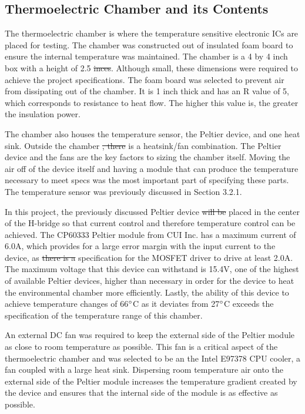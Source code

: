 \documentclass[11pt,letter]{article}
\providecommand{\DIFadd}[1]{{\protect\color{blue}\uwave{#1}}} %
\providecommand{\DIFdel}[1]{{\protect\color{red}\sout{#1}}}                      %
\providecommand{\DIFaddbegin}{} %
\providecommand{\DIFaddend}{} %
\providecommand{\DIFdelbegin}{} %
\providecommand{\DIFdelend}{} %
\newcommand{\DIFscaledelfig}{0.5}
\newlength{\DIFdelgraphicswidth} %
\newlength{\DIFdelgraphicsheight} %
\newcommand{\DIFaddincludegraphics}[2][]{{\color{blue}\fbox{\DIFOincludegraphics[#1]{#2}}}} %
\newcommand{\DIFdelincludegraphics}[2][]{%
\sbox{\DIFdelgraphicsbox}{\DIFOincludegraphics[#1]{#2}}%
\settoboxwidth{\DIFdelgraphicswidth}{\DIFdelgraphicsbox} %
\settoboxtotalheight{\DIFdelgraphicsheight}{\DIFdelgraphicsbox} %
\scalebox{\DIFscaledelfig}{%
\parbox[b]{\DIFdelgraphicswidth}{\usebox{\DIFdelgraphicsbox}\\[-\baselineskip] \rule{\DIFdelgraphicswidth}{0em}}\llap{\resizebox{\DIFdelgraphicswidth}{\DIFdelgraphicsheight}{%
\setlength{\unitlength}{\DIFdelgraphicswidth}%
\begin{picture}(1,1)%
\thicklines\linethickness{2pt} %
{\color[rgb]{1,0,0}\put(0,0){\framebox(1,1){}}}%
{\color[rgb]{1,0,0}\put(0,0){\line( 1,1){1}}}%
{\color[rgb]{1,0,0}\put(0,1){\line(1,-1){1}}}%
\end{picture}%
}\hspace*{3pt}}} %
} %
\DeclareRobustCommand{\DIFaddbegin}{\DIFOaddbegin \let\includegraphics\DIFaddincludegraphics} %
\DeclareRobustCommand{\DIFaddend}{\DIFOaddend \let\includegraphics\DIFOincludegraphics} %
\DeclareRobustCommand{\DIFdelbegin}{\DIFOdelbegin \let\includegraphics\DIFdelincludegraphics} %
\DeclareRobustCommand{\DIFdelend}{\DIFOaddend \let\includegraphics\DIFOincludegraphics} %
\begin{document}
\subsection{Thermoelectric Chamber and its Contents}

The thermoelectric chamber is where the temperature sensitive electronic ICs are placed for testing. The chamber was constructed out of insulated foam board to ensure the internal temperature was maintained. The chamber is a 4 by 4 inch box with a height of 2.5 \DIFdelbegin \DIFdel{inces}\DIFdelend \DIFaddbegin \DIFadd{inches}\DIFaddend . Although small, these dimensions were required to achieve the project specifications. The foam board was selected to prevent air from dissipating out of the chamber. It is 1 inch thick and has an R value of 5, which corresponds to resistance to heat flow. The higher this value is, the greater the insulation power.

The chamber also houses the temperature sensor, the Peltier device, and one heat sink. Outside the chamber \DIFdelbegin \DIFdel{, there }\DIFdelend is a heatsink/fan combination. The Peltier device and the fans are the key factors to sizing the chamber itself. Moving the air off of the device itself and having a module that can produce the temperature necessary to meet specs was the most important part of specifying these parts. The temperature sensor was previously discussed in Section 3.2.1.

In this project, the previously discussed Peltier device \DIFdelbegin \DIFdel{will be }\DIFdelend \DIFaddbegin \DIFadd{is }\DIFaddend placed in the center of the H-bridge so that current control and therefore temperature control can be achieved. The CP60333 Peltier module from CUI Inc. has a maximum current of 6.0A, which provides for a large error margin with the input current to the device, as \DIFdelbegin \DIFdel{there is a }\DIFdelend \DIFaddbegin \DIFadd{the }\DIFaddend specification for the MOSFET driver to drive at least 2.0A. The maximum voltage that this device can withstand is 15.4V, one of the highest of available Peltier devices, higher than necessary in order for the device to heat the environmental chamber more efficiently. Lastly, the ability of this device to achieve temperature changes of 66$\degree$C as it deviates from 27$\degree$C exceeds the specification of the temperature range of this chamber.

An external DC fan was required to keep the external side of the Peltier module as close to room temperature as possible. This fan is a critical aspect of the thermoelectric chamber and was selected to be an the Intel E97378 CPU cooler, a fan coupled with a large heat sink. Dispersing room temperature air onto the external side of the Peltier module increases the temperature gradient created by the device and ensures that the internal side of the module is as effective as possible.
\end{document}
